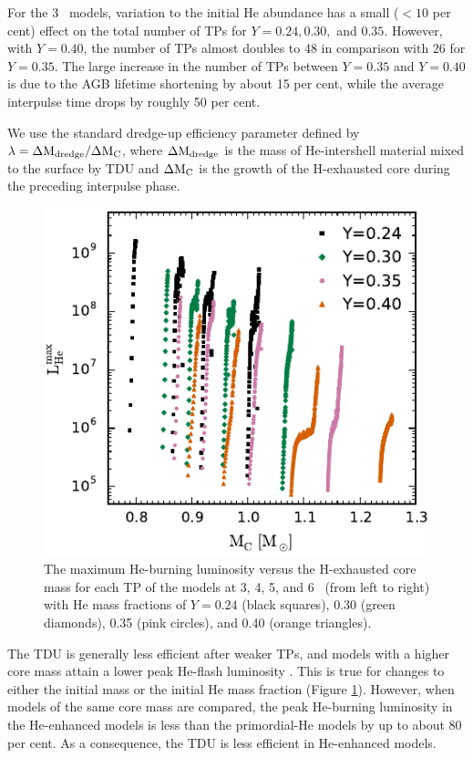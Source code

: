 For the 3 \Msun\ models, variation to the initial He abundance has a small ($<10$ per cent) effect on the total number of TPs for $Y=0.24,0.30,$ and $0.35$. However, with $Y=0.40$, the number of TPs almost doubles to 48 in comparison with 26 for $Y=0.35$. The large increase in the number of TPs between $Y=0.35$ and $Y=0.40$ is due to the AGB lifetime shortening by about 15 per cent, while the average interpulse time drops by roughly 50 per cent.

We use the standard dredge-up efficiency parameter defined by $\lambda = \Delta\mathrm{M}_\mathrm{dredge}/\Delta\mathrm{M}_\mathrm{C}$, where $\Delta\mathrm{M}_\mathrm{dredge}$ is the mass of He-intershell material mixed to the surface by TDU and $\Delta\mathrm{M}_\mathrm{C}$ is the growth of the H-exhausted core during the preceding interpulse phase.

\begin{figure}
 \begin{center}\includegraphics[width=\columnwidth]{fig-coremass-lumhe.pdf}\end{center}
 \caption{The maximum He-burning luminosity versus the H-exhausted core mass for each TP of the models at 3, 4, 5, and 6 \Msun\ (from left to right) with He mass fractions of $Y= 0.24$ (black squares), 0.30 (green diamonds), 0.35 (pink circles), and 0.40 (orange triangles).}\label{fig:coremass-lumhe}
\end{figure}

The TDU is generally less efficient after weaker TPs, and models with a higher core mass attain a lower peak He-flash luminosity \citep{Sackmann:1980dn,Boothroyd:1988jl,Straniero:2003ho}. This is true for changes to either the initial mass or the initial He mass fraction (Figure \ref{fig:coremass-lumhe}). However, when models of the same core mass are compared, the peak He-burning luminosity in the He-enhanced models is less than the primordial-He models by up to about 80 per cent. As a consequence, the TDU is less efficient in He-enhanced models.

